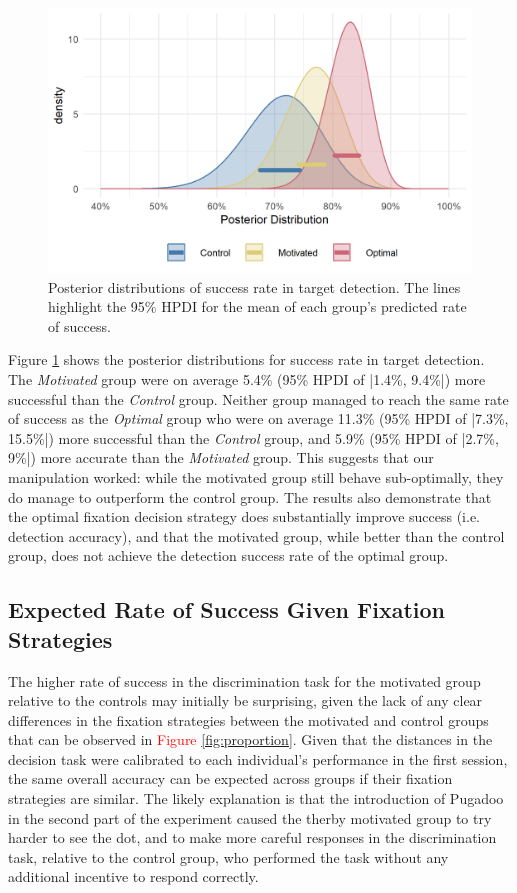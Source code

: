 \documentclass[vision,article,submit,moreauthors,pdftex,10pt,a4paper]{mdpi}
\begin{document}
\begin{figure}[H]
	\centering
	\includegraphics[width=12 cm]{../Figures/Model_stan_rawacc_pdata_hpdi.png}
	\caption{Posterior distributions of success rate in target detection. The lines highlight the 95\% HPDI for the mean of each group’s predicted rate of success. 
	}
	\label{fig:rawacc_dist}
\end{figure} 

Figure \ref{fig:rawacc_dist} shows the posterior distributions for success rate in target detection. The \textit{Motivated} group were on average 5.4\% (95\% HPDI of |1.4\%, 9.4\%|) more successful than the \textit{Control} group. Neither group managed to reach the same rate of success as the \textit{Optimal} group who were on average 11.3\% (95\% HPDI of |7.3\%, 15.5\%|) more successful than the \textit{Control} group, and 5.9\% (95\% HPDI of |2.7\%, 9\%|) more accurate than the \textit{Motivated} group. This suggests that our manipulation worked: while the motivated group still behave sub-optimally, they do manage to outperform the control group. The results also demonstrate that the optimal fixation decision strategy does substantially improve success (i.e. detection accuracy), and that the motivated group, while better than the control group, does not achieve the detection success rate of the optimal group. 

\subsection{Expected Rate of Success Given Fixation Strategies}
The higher rate of success in the discrimination task for the motivated group relative to the controls may initially be surprising, given the lack of any clear differences in the fixation strategies between the motivated and control groups that can be observed in \textcolor{red}{Figure \ref{fig:proportion}}. Given that the distances in the decision task were calibrated to each individual’s performance in the first session, the same overall accuracy can be expected across groups if their fixation strategies are similar. The likely explanation is that the introduction of Pugadoo in the second part of the experiment caused the therby motivated group to try harder to see the dot, and to make more careful responses in the discrimination task, relative to the control group, who performed the task without any additional incentive to respond correctly. 
\end{document}
